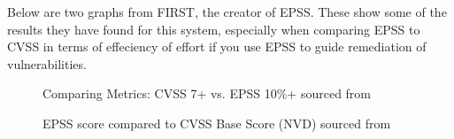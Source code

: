 \documentclass[12pt]{article}
\begin{document}
Below are two graphs from FIRST, the creator of EPSS. These show some of the results they have
found for this system, especially when comparing EPSS to CVSS in terms of effeciency of effort if
you use EPSS to guide remediation of vulnerabilities.

\begin{figure}
	\centering
	\caption{\label{fig:epss}Comparing Metrics: CVSS 7+ vs. EPSS 10\%+ sourced from \cite{EPSS}}
\end{figure}

\begin{figure}
	\centering
	\caption{\label{fig:epss_and_cvss}EPSS score compared to CVSS Base Score (NVD) sourced from
		\cite{EPSS_USER}}
\end{figure}
\end{document}
